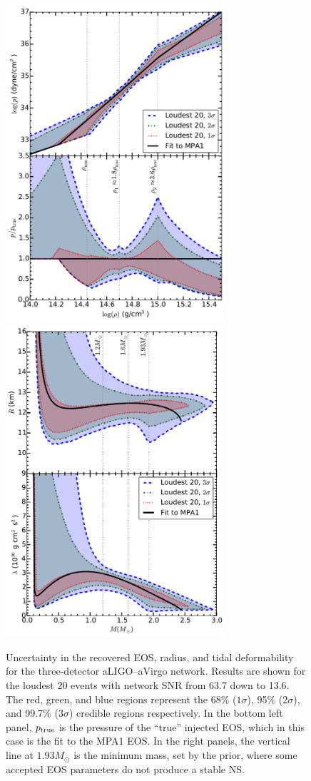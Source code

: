 \documentclass[twocolumn,prd,amssymb,aps,nofootinbib,showpacs,epsf]{revtex4}
\begin{document}
\begin{figure}[!htb]
\begin{center}
\includegraphics[width=3.2in]{LALMCMCmpa1FitTaylorF2ZeroNoiseBNS20p.pdf}
\includegraphics[width=3.2in]{LALMCMCmpa1FitTaylorF2ZeroNoiseBNS20Radiuslambda.pdf}
\caption{Uncertainty in the recovered EOS, radius, and tidal deformability for the three-detector aLIGO--aVirgo network. Results are shown for the loudest 20 events with network SNR from 63.7 down to 13.6. The red, green, and blue regions represent the 68\% ($1\sigma$), 95\% ($2\sigma$), and 99.7\% ($3\sigma$) credible regions respectively. In the bottom left panel, $p_{\rm true}$ is the pressure of the ``true'' injected EOS, which in this case is the fit to the MPA1 EOS. In the right panels, the vertical line at $1.93M_\odot$ is the minimum mass, set by the prior, where some accepted EOS parameters do not produce a stable NS.}
\label{fig:mpa1fit}
\end{center}
\end{figure}
\end{document}
